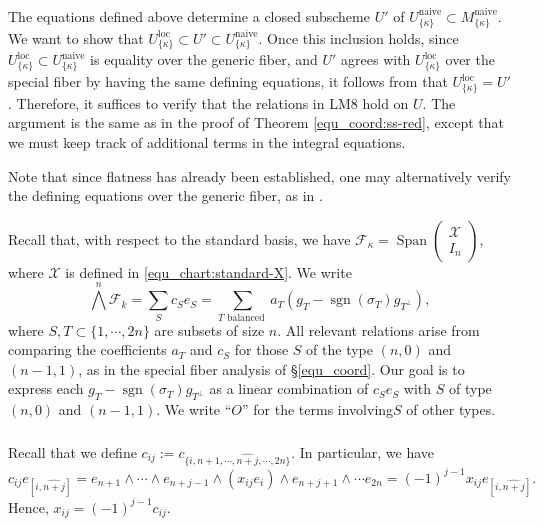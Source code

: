 \documentclass[pdflatex,sn-mathphys-num]{sn-jnl}%
\theoremstyle{thmstyleone}%
\theoremstyle{thmstyletwo}%
\numberwithin{equation}{subsection}
\theoremstyle{thmstylethree}%
\newcommand{\CF}{\ensuremath{\mathcal{F}}\xspace}
\newcommand{\CX}{\ensuremath{\mathcal{X}}\xspace}
\newcommand{\loc}{\ensuremath{\mathrm{loc}}\xspace}
\newcommand{\naive}{\ensuremath{\mathrm{naive}}\xspace}
\DeclareMathOperator{\sgn}{sgn}
\newcommand{\wh}{\widehat}
\DeclareMathOperator{\Span}{Span}
\begin{document}
\subsubsection{}
The equations defined above determine a closed subscheme $U'$ of $U^\naive_{\{\kappa\}}\subset M^\naive_{\{\kappa\}}$.
We want to show that $U_{\{\kappa\}}^\loc\subset U'\subset U^\naive_{\{\kappa\}}$.
Once this inclusion holds, since $U^\loc_{\{\kappa\}}\subset U^\naive_{\{\kappa\}}$ is equality over the generic fiber, and $U'$ agrees with $U^\loc_{\{\kappa\}}$ over the special fiber by having the same defining equations, it follows from \cite[Proposition 14.17]{GW2020} that $U^\loc_{\{\kappa\}}=U'$. 
Therefore, it suffices to verify that the relations in {\selectfont  LM8} hold on $U$.
The argument is the same as in the proof of Theorem \ref{equ_coord:ss-red}, except that we must keep track of additional terms in the integral equations.

Note that since flatness has already been established, one may alternatively verify the defining equations over the generic fiber, as in \cite{Zachos}.

Recall that, with respect to the standard basis, we have $\CF_\kappa=\Span\left(\begin{matrix}\CX\\I_n\end{matrix}\right)$, where $\CX$ is defined in \eqref{equ_chart:standard-X}.
We write
\begin{equation*}
	\bigwedge^n\CF_k=\sum_S c_S e_S=\sum_{T \text{ balanced }}a_{T}(g_T-\sgn(\sigma_T)g_{T^\perp}),
\end{equation*}
where $S,T\subset \{1,\cdots,2n\}$ are subsets of size $n$. 
All relevant relations arise from comparing the coefficients $a_T$ and $c_S$ for those $S$ of the type $(n,0)$ and $(n-1,1)$, as in the special fiber analysis of \S \ref{equ_coord}.
Our goal is to express each $g_T-\sgn(\sigma_T)g_{T^\perp}$ as a linear combination of $c_S e_S$ with $S$ of type $(n,0)$ and $(n-1,1)$.
We write ``$O$'' for the terms involving$S$ of other types.

\subsubsection{}
Recall that we define $c_{ij}:=c_{\{i,n+1,\cdots,\wh{n+j},\cdots,2n\}}$.
In particular, we have
\begin{equation*}
    c_{ij}e_{[i,\wh{n+j}]}=e_{n+1}\wedge\cdots\wedge e_{n+j-1}\wedge (x_{ij}e_i)\wedge e_{n+j+1}\wedge\cdots e_{2n}=(-1)^{j-1}x_{ij}e_{[i,\wh{n+j}]}.
\end{equation*}
Hence, $x_{ij}=(-1)^{j-1}c_{ij}$.
			
\end{document}
